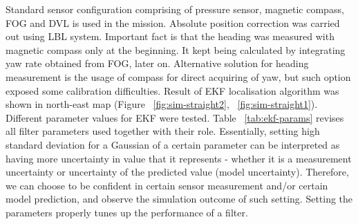 Standard sensor configuration comprising of pressure sensor, magnetic compass, FOG and DVL is used in the mission. Absolute position correction was carried out using LBL system. Important fact is that the heading was measured with magnetic compass only at the beginning. It kept being calculated by integrating yaw rate obtained from FOG, later on. Alternative solution for heading measurement is the usage of compass for direct acquiring of yaw, but such option exposed some calibration difficulties. Result of EKF localisation algorithm was shown in north-east map (Figure ~\ref{fig:sim-straight2}, ~\ref{fig:sim-straight1}). Different parameter values for EKF were tested. Table ~\ref{tab:ekf-params} revises all filter parameters used together with their role. Essentially, setting high standard deviation for a Gaussian of a certain parameter can be interpreted as having more uncertainty in value that it represents - whether it is a measurement uncertainty or uncertainty of the predicted value (model uncertainty). Therefore, we can choose to be confident in certain sensor measurement and/or certain model prediction, and observe the simulation outcome of such setting. Setting the parameters properly tunes up the performance of a filter.  
\addtocounter{footnote}{1}
\footnotetext[\value{footnote}]{as it appears in algorithm equations}  
